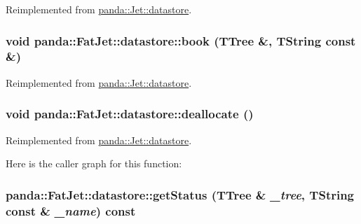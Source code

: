 Reimplemented from \hyperlink{structpanda_1_1Jet_1_1datastore_a899f59963d18c2c13019d9ed27eb7745}{panda::Jet::datastore}.\hypertarget{structpanda_1_1FatJet_1_1datastore_abc4532c13b6be8b1feaf70e3504f5f59}{
\subsubsection[{book}]{\setlength{\rightskip}{0pt plus 5cm}void panda::FatJet::datastore::book (TTree \&, \/  TString const \&)}}
\label{structpanda_1_1FatJet_1_1datastore_abc4532c13b6be8b1feaf70e3504f5f59}


Reimplemented from \hyperlink{structpanda_1_1Jet_1_1datastore_a6b3a8bbeb4fa9c002c5eebbd97962095}{panda::Jet::datastore}.\hypertarget{structpanda_1_1FatJet_1_1datastore_ae981e60d6fc142e3bbb4730a8a856fa7}{
\subsubsection[{deallocate}]{\setlength{\rightskip}{0pt plus 5cm}void panda::FatJet::datastore::deallocate ()}}
\label{structpanda_1_1FatJet_1_1datastore_ae981e60d6fc142e3bbb4730a8a856fa7}


Reimplemented from \hyperlink{structpanda_1_1Jet_1_1datastore_a606415eee51c1a38fc0613f3b2946d1e}{panda::Jet::datastore}.

Here is the caller graph for this function:\hypertarget{structpanda_1_1FatJet_1_1datastore_a83669574414333b1656878e0ec09c345}{
\subsubsection[{getStatus}]{ panda::FatJet::datastore::getStatus (TTree \& {\em \_\-tree}, \/  TString const \& {\em \_\-name}) const}}
\label{structpanda_1_1FatJet_1_1datastore_a83669574414333b1656878e0ec09c345}


